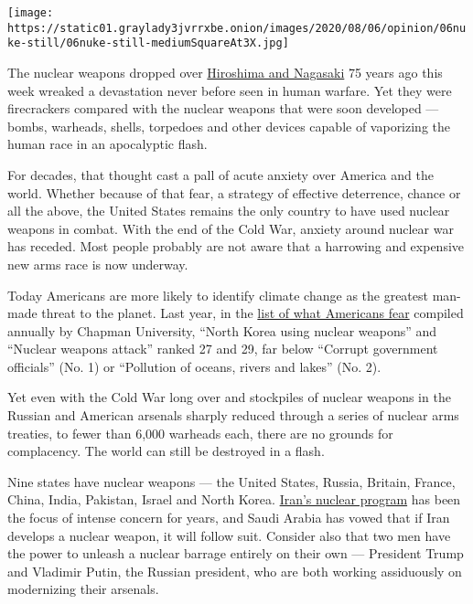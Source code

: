 \texttt{[image: https://static01.graylady3jvrrxbe.onion/images/2020/08/06/opinion/06nuke-still/06nuke-still-mediumSquareAt3X.jpg]}

The nuclear weapons dropped over
\href{https://www.nytimes3xbfgragh.onion/2020/08/06/world/asia/hiroshima-nagasaki-japan-photos.html}{Hiroshima
and Nagasaki} 75 years ago this week wreaked a devastation never before
seen in human warfare. Yet they were firecrackers compared with the
nuclear weapons that were soon developed --- bombs, warheads, shells,
torpedoes and other devices capable of vaporizing the human race in an
apocalyptic flash.

For decades, that thought cast a pall of acute anxiety over America and
the world. Whether because of that fear, a strategy of effective
deterrence, chance or all the above, the United States remains the only
country to have used nuclear weapons in combat. With the end of the Cold
War, anxiety around nuclear war has receded. Most people probably are
not aware that a harrowing and expensive new arms race is now underway.

Today Americans are more likely to identify climate change as the
greatest man-made threat to the planet. Last year, in the
\href{https://www.chapman.edu/wilkinson/research-centers/babbie-center/survey-american-fears.aspx\#:~:text=Results\%20from\%20the\%202019\%20Chapman,warfare\%20for\%20the\%202019\%20survey.}{list
of what Americans fear} compiled annually by Chapman University, ``North
Korea using nuclear weapons'' and ``Nuclear weapons attack'' ranked 27
and 29, far below ``Corrupt government officials'' (No. 1) or
``Pollution of oceans, rivers and lakes'' (No. 2).

Yet even with the Cold War long over and stockpiles of nuclear weapons
in the Russian and American arsenals sharply reduced through a series of
nuclear arms treaties, to fewer than 6,000 warheads each, there are no
grounds for complacency. The world can still be destroyed in a flash.

Nine states have nuclear weapons --- the United States, Russia, Britain,
France, China, India, Pakistan, Israel and North Korea.
\href{https://www.nytimes3xbfgragh.onion/2020/08/01/world/asia/iran-khamenei-us-sanctions.html}{Iran's
nuclear program} has been the focus of intense concern for years, and
Saudi Arabia has vowed that if Iran develops a nuclear weapon, it will
follow suit. Consider also that two men have the power to unleash a
nuclear barrage entirely on their own --- President Trump and Vladimir
Putin, the Russian president, who are both working assiduously on
modernizing their arsenals.

